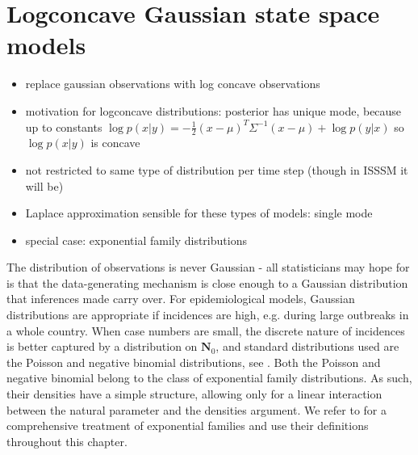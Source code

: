 \section{Logconcave Gaussian state space models}
\label{sec:logconcave_gaussian_state_space_models}

\begin{itemize}
    \item replace gaussian observations with log concave observations
    \item motivation for logconcave distributions: posterior has unique mode, because up to constants $\log p(x | y) = - \frac{1}{2} (x - \mu)^T \Sigma^{-1} (x - \mu) + \log p(y | x) $ so $\log p(x|y)$ is concave
    \item not restricted to same type of distribution per time step (though in ISSSM it will be)
    \item Laplace approximation sensible for these types of models: single mode
    \item special case: exponential family distributions
\end{itemize}

The distribution of observations is never Gaussian - all statisticians may hope for is that the data-generating mechanism is close enough to a Gaussian distribution that inferences made carry over.
For epidemiological models, Gaussian distributions are appropriate if incidences are high, e.g. during large outbreaks in a whole country. 
When case numbers are small, the discrete nature of incidences is better captured by a distribution on $\mathbf N_{0}$, and standard distributions used are the Poisson and negative binomial distributions, see .
Both the Poisson and negative binomial belong to the class of exponential family distributions. As such, their densities have a simple structure, allowing only for a linear interaction between the natural parameter and the densities argument. We refer to \cite{Brown1986Fundamentals} for a comprehensive treatment of exponential families and use their definitions throughout this chapter.

